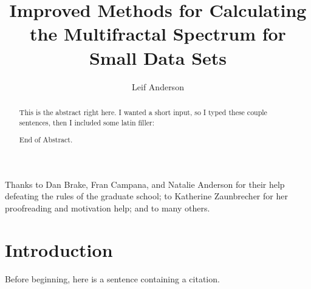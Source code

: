 \documentclass[draft]{csuthesis} %
\title[Improved Multifractal Calculations]{Improved Methods for Calculating the Multifractal Spectrum for Small Data Sets}
\author{Leif Anderson}
\begin{document}
\frontmatter

% 
\begin{abstract}
This is the abstract right here. I wanted a short input, so I typed these couple sentences, then I included some latin filler: \lipsum[1-4]

End of Abstract.
\end{abstract}

\begin{acknowledgements}
Thanks to Dan Brake, Fran Campana, and Natalie Anderson for their help defeating the rules of the graduate school; to Katherine Zaunbrecher for her proofreading and motivation help; and to many others.
\end{acknowledgements}%

\maketitle


\tableofcontents %
\listoftables %
\listoffigures %

\mainmatter %
\chapter{Introduction}

Before beginning, here is a sentence containing a citation\cite{multifrac}.
\end{document}
